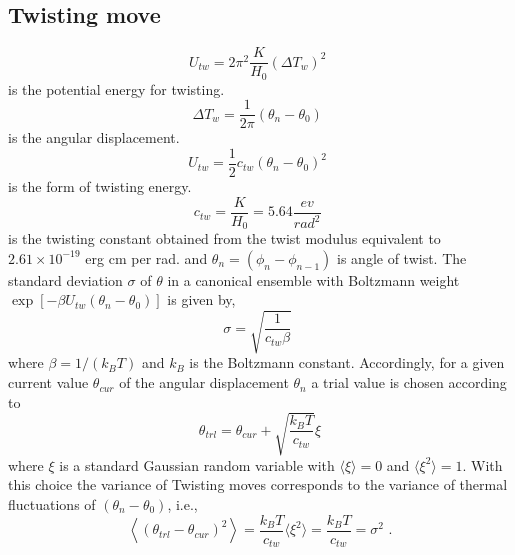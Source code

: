 \documentclass[12pt,masters,final]{UTRGVthesis}
\begin{document}
\subsection{Twisting move}{\label{tmv}}
%
\begin{equation}\label{twe}
 U_{tw} = 2 \pi^2 \frac{K}{H_{0}} \left(\Delta T_{w} \right)^2 \, \,
\end{equation} 
%
is the potential energy for twisting. 
\begin{equation}\label{twe}
\Delta T_{w} = \frac{1}{2\pi} \left(\theta_{n}-\theta_{0} \right) \, \,
\end{equation}
%
is the angular displacement.
%
\begin{equation}\label{ctwe}
U_{tw}= \frac{1}{2} c_{tw} \left(\theta_{n}-\theta_{0} \right)^2 \, \, 
\end{equation}
%
is the form of twisting energy.
%
\begin{equation}\label{twc}
c_{tw} = \frac{K}{H_{0}} = 5.64 \frac{ev}{rad^2} \,\,
\end{equation}
%
is the twisting constant obtained from the twist modulus equivalent to  $2.61 \times 10^{-19}$ erg cm per rad. and $\theta_n = \left(\phi_n-\phi_{n-1} \right) $ is angle of twist. The standard deviation $\sigma$ of $\theta$ in a canonical ensemble with Boltzmann weight
$\exp \left[-\beta U_{tw} \left(\theta_n-\theta_0 \right) \right]$ is given by, 
%
\begin{equation}\label{tsd}
\sigma = \sqrt{\frac{1}{c_{tw} \beta}} \, \,
\end{equation}
%
where $\beta = 1 / (k_B T)$ and $k_B$ is the Boltzmann constant.
%
Accordingly, for a given current value $\theta_{cur}$ of the angular displacement $\theta_n$ a trial value
is chosen according to
%
\begin{equation} \label{thetatrl}
\theta_{trl} = \theta_{cur} + \sqrt{\frac{k_BT}{c_{tw}}} \xi
\end{equation}
%
where $\xi$ is a standard Gaussian random variable with $\langle \xi \rangle = 0$ and
$\langle \xi^2 \rangle = 1$. With this choice the variance of Twisting moves
corresponds to the variance of thermal fluctuations of $\left(\theta_n-\theta_0 \right)$, i.e.,
%
\begin{equation} \label{tvar} 
  \left< \left(\theta_{trl} - \theta_{cur} \right)^2 \right> = \frac{k_{B}T}{c_{tw}} \langle \xi^2 \rangle =
  \frac{k_{B}T}{c_{tw}} = \sigma^2 \, \, .
\end{equation}
%
\end{document}
